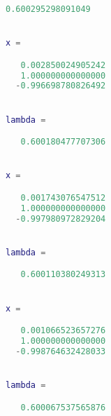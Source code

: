 \documentclass[a4]{article}
\begin{document}
\begin{lstlisting}[language=Matlab]
   0.600295298091049


x =

   0.002850024905242
   1.000000000000000
  -0.996698780826492


lambda =

   0.600180477707306


x =

   0.001743076547512
   1.000000000000000
  -0.997980972829204


lambda =

   0.600110380249313


x =

   0.001066523657276
   1.000000000000000
  -0.998764632428033


lambda =

   0.600067537565876
\end{lstlisting}
\end{document}
